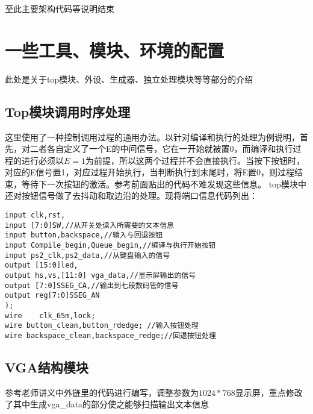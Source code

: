 \documentclass[lang=cn,11pt,a4paper]{elegantpaper}
\begin{document}
至此主要架构代码等说明结束

\section{一些工具、模块、环境的配置}

此处是关于top模块、外设、生成器、独立处理模块等等部分的介绍

\subsection{Top模块调用时序处理}

这里使用了一种控制调用过程的通用办法。以针对编译和执行的处理为例说明，首先，对二者各自定义了一个E的中间信号，它在一开始就被置0，而编译和执行过程的进行必须以$ E=1 $为前提，所以这两个过程并不会直接执行。当按下按钮时，对应的E信号置1，对应过程开始执行，当判断执行到末尾时，将E置0，则过程结束，等待下一次按钮的激活。参考前面贴出的代码不难发现这些信息。
top模块中还对按钮信号做了去抖动和取边沿的处理。现将端口信息代码列出：

\begin{lstlisting}
input clk,rst,
input [7:0]SW,//从开关处读入所需要的文本信息
input button,backspace,//输入与回退按钮
input Compile_begin,Queue_begin,//编译与执行开始按钮
input ps2_clk,ps2_data,//从键盘输入的信号
output [15:0]led,
output hs,vs,[11:0] vga_data,//显示屏输出的信号
output [7:0]SSEG_CA,//输出到七段数码管的信号
output reg[7:0]SSEG_AN
); 
wire    clk_65m,lock;
wire button_clean,button_rdedge; //输入按钮处理
wire backspace_clean,backspace_redge;//回退按钮处理
\end{lstlisting}

\subsection{VGA结构模块}

参考老师讲义中外链里的代码进行编写，调整参数为$1024*768$显示屏，重点修改了其中生成vga\_data的部分使之能够扫描输出文本信息
\end{document}
